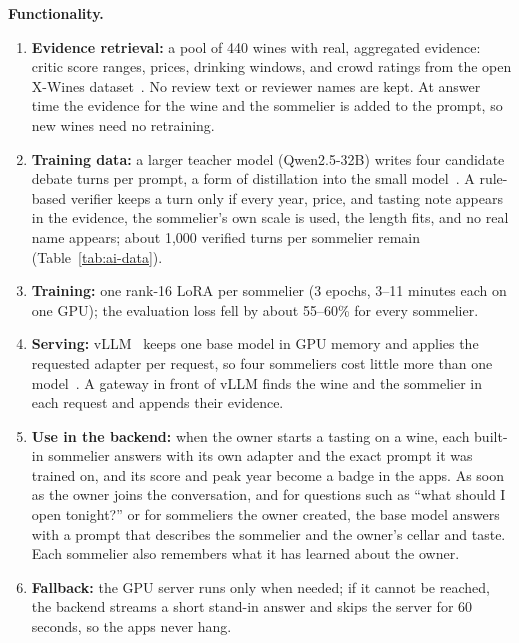 \documentclass[conference]{IEEEtran}
\begin{document}
\textbf{Functionality.}
\begin{enumerate}
    \item \textbf{Evidence retrieval:} a pool of 440 wines with real, aggregated evidence: critic score ranges, prices, drinking windows, and crowd ratings from the open X-Wines dataset~\cite{xwines}. No review text or reviewer names are kept. At answer time the evidence for the wine and the sommelier is added to the prompt, so new wines need no retraining.
    \item \textbf{Training data:} a larger teacher model (Qwen2.5-32B) writes four candidate debate turns per prompt, a form of distillation into the small model~\cite{distill,selfinstruct}. A rule-based verifier keeps a turn only if every year, price, and tasting note appears in the evidence, the sommelier's own scale is used, the length fits, and no real name appears; about 1,000 verified turns per sommelier remain (Table~\ref{tab:ai-data}).
    \item \textbf{Training:} one rank-16 LoRA per sommelier (3 epochs, 3--11 minutes each on one GPU); the evaluation loss fell by about 55--60\% for every sommelier.
    \item \textbf{Serving:} vLLM~\cite{vllm} keeps one base model in GPU memory and applies the requested adapter per request, so four sommeliers cost little more than one model~\cite{slora,punica}. A gateway in front of vLLM finds the wine and the sommelier in each request and appends their evidence.
    \item \textbf{Use in the backend:} when the owner starts a tasting on a wine, each built-in sommelier answers with its own adapter and the exact prompt it was trained on, and its score and peak year become a badge in the apps. As soon as the owner joins the conversation, and for questions such as ``what should I open tonight?'' or for sommeliers the owner created, the base model answers with a prompt that describes the sommelier and the owner's cellar and taste. Each sommelier also remembers what it has learned about the owner.
    \item \textbf{Fallback:} the GPU server runs only when needed; if it cannot be reached, the backend streams a short stand-in answer and skips the server for 60 seconds, so the apps never hang.
\end{enumerate}
\end{document}
